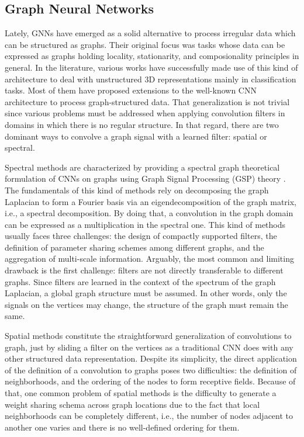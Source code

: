 \subsection{Graph Neural Networks}
\label{cha:tactile:sec:relatedworks:subsec:gcns}

Lately, \acp{GNN} have emerged as a solid alternative to process irregular data which can be structured as graphs. Their original focus was tasks whose data can be expressed as graphs holding locality, stationarity, and composionality principles in general. In the literature, various works have successfully made use of this kind of architecture to deal with unstructured \acs{3D} representations mainly in classification tasks. Most of them  have proposed extensions to the well-known \ac{CNN} architecture to process graph-structured data. That generalization is not trivial since various problems must be addressed when applying convolution filters in domains in which there is no regular structure. In that regard, there are two dominant ways to convolve a graph signal with a learned filter: spatial or spectral.

Spectral methods are characterized by providing a spectral graph theoretical formulation of CNNs on graphs using Graph Signal Processing (GSP) theory \cite{Shuman2013}. The fundamentals of this kind of methods rely on decomposing the graph Laplacian to form a Fourier basis via an eigendecomposition of the graph matrix, i.e., a spectral decomposition. By doing that, a convolution in the graph domain can be expressed as a multiplication in the spectral one. This kind of methods usually faces three challenges: the design of compactly supported filters, the definition of parameter sharing schemes among different graphs, and the aggregation of multi-scale information. Arguably, the most common and limiting drawback is the first challenge: filters are not directly transferable to different graphs. Since filters are learned in the context of the spectrum of the graph Laplacian, a global graph structure must be assumed. In other words, only the signals on the vertices may change, the structure of the graph must remain the same.

Spatial methods constitute the straightforward generalization of convolutions to graph, just by sliding a filter on the vertices as a traditional CNN does with any other structured data representation. Despite its simplicity, the direct application of the definition of a convolution to graphs poses two difficulties: the definition of neighborhoods, and the ordering of the nodes to form receptive fields. Because of that, one common problem of spatial methods is the difficulty to generate a weight sharing schema across graph locations due to the fact that local neighborhoods can be completely different, i.e., the number of nodes adjacent to another one varies and there is no well-defined ordering for them.

